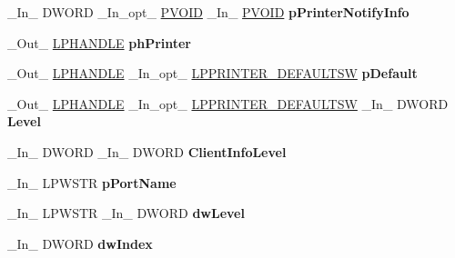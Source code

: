 \begin{DoxyCompactItemize}
\+\_\+\+In\+\_\+ D\+W\+O\+RD \+\_\+\+In\+\_\+opt\+\_\+ \hyperlink{interfacevoid}{P\+V\+O\+ID} \+\_\+\+In\+\_\+ \hyperlink{interfacevoid}{P\+V\+O\+ID} {\bfseries p\+Printer\+Notify\+Info}
\item 
\mbox{\label{struct___p_r_i_n_t_p_r_o_v_i_d_o_r_a42bc5844a1eb6d9d9a53ed6b26e9b85c}} 
\+\_\+\+Out\+\_\+ \hyperlink{interfacevoid}{L\+P\+H\+A\+N\+D\+LE} {\bfseries ph\+Printer}
\item 
\mbox{\label{struct___p_r_i_n_t_p_r_o_v_i_d_o_r_a6e067a8787d2b6900d7db5e8ed7fb231}} 
\+\_\+\+Out\+\_\+ \hyperlink{interfacevoid}{L\+P\+H\+A\+N\+D\+LE} \+\_\+\+In\+\_\+opt\+\_\+ \hyperlink{struct___p_r_i_n_t_e_r___d_e_f_a_u_l_t_s_w}{L\+P\+P\+R\+I\+N\+T\+E\+R\+\_\+\+D\+E\+F\+A\+U\+L\+T\+SW} {\bfseries p\+Default}
\item 
\mbox{\label{struct___p_r_i_n_t_p_r_o_v_i_d_o_r_aea2173e6f2e34765898ad0664a2574b3}} 
\+\_\+\+Out\+\_\+ \hyperlink{interfacevoid}{L\+P\+H\+A\+N\+D\+LE} \+\_\+\+In\+\_\+opt\+\_\+ \hyperlink{struct___p_r_i_n_t_e_r___d_e_f_a_u_l_t_s_w}{L\+P\+P\+R\+I\+N\+T\+E\+R\+\_\+\+D\+E\+F\+A\+U\+L\+T\+SW} \+\_\+\+In\+\_\+ D\+W\+O\+RD {\bfseries Level}
\item 
\mbox{\label{struct___p_r_i_n_t_p_r_o_v_i_d_o_r_a421fc3610d4a16fe3a9a0e44a1fa5e17}} 
\+\_\+\+In\+\_\+ D\+W\+O\+RD \+\_\+\+In\+\_\+ D\+W\+O\+RD {\bfseries Client\+Info\+Level}
\item 
\mbox{\label{struct___p_r_i_n_t_p_r_o_v_i_d_o_r_a89f13d6b1cdac122f147972e37d2cb2d}} 
\+\_\+\+In\+\_\+ L\+P\+W\+S\+TR {\bfseries p\+Port\+Name}
\item 
\mbox{\label{struct___p_r_i_n_t_p_r_o_v_i_d_o_r_a43190b3459142f16eba0d798b03b1245}} 
\+\_\+\+In\+\_\+ L\+P\+W\+S\+TR \+\_\+\+In\+\_\+ D\+W\+O\+RD {\bfseries dw\+Level}
\item 
\mbox{\label{struct___p_r_i_n_t_p_r_o_v_i_d_o_r_a6f286859ec5d7110eba9e708dbcb4313}} 
\+\_\+\+In\+\_\+ D\+W\+O\+RD {\bfseries dw\+Index}
\item 
\mbox{\label{struct___p_r_i_n_t_p_r_o_v_i_d_o_r_acf2aeb7c96a264f2d795db0395ce79b9}} 

\end{DoxyCompactItemize}
